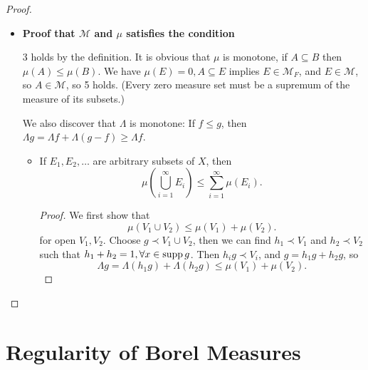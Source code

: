 \documentclass[../main.tex]{subfiles}
\begin{document}
\begin{proof}
\begin{itemize}
	\item \textbf{Proof that $\mathcal{M}$ and $\mu$ satisfies the condition}

		3 holds by the definition. It is obvious that $\mu$ is monotone, if $A \subseteq B$ then $\mu(A) \leq \mu(B)$. We have $\mu(E)=0,A \subseteq E$ implies $E\in \mathcal{M}_F$,  and $E\in \mathcal{M}$, so $A\in \mathcal{M}$, so 5 holds. (Every zero measure set must be a supremum of the measure of its subsets.)

		We also discover that $\Lambda$ is monotone: If $f\leq g$, then $\Lambda g = \Lambda f + \Lambda (g-f) \geq \Lambda f$.

		\begin{itemize}
		\item If $E_1, E_2, \ldots $ are arbitrary subsets of $X$, then
			\begin{equation*}
				\mu\left( \bigcup_{i=1}^\infty E_i \right) \leq \sum_{i=1}^{\infty } \mu(E_i).
			\end{equation*}
			\begin{proof}
				We first show that
				\begin{equation*}
				\mu(V_1\cup V_2) \leq \mu(V_1) + \mu(V_2).
				\end{equation*}
				for open $V_1,V_2$. Choose $g\prec V_1\cup V_2$, then we can find $h_1\prec V_1$ and $h_2\prec V_2$ such that $h_1+h_2=1, \forall x\in \operatorname{supp} g$. Then $h_ig\prec V_i$, and $g=h_1g+h_2g$, so
				\begin{equation*}
				\Lambda g = \Lambda (h_1g)+\Lambda(h_2g) \leq \mu(V_1) + \mu(V_2).
				\end{equation*}
			\end{proof}
		\end{itemize}
	\end{itemize}
\end{proof}

\section{Regularity of Borel Measures}
\end{document}

